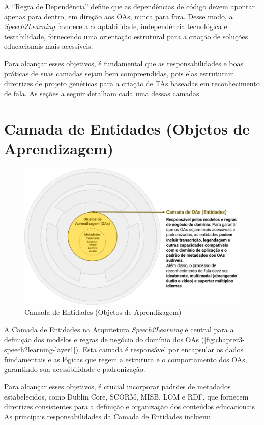 A ``Regra de Dependência'' define que as dependências de código devem apontar apenas para dentro, em direção aos OAs, nunca para fora. Desse modo, a \textit{Speech2Learning} favorece a adaptabilidade, independência tecnológica e testabilidade, fornecendo uma orientação estrutural para a criação de soluções educacionais mais acessíveis. 

Para alcançar esses objetivos, é fundamental que as responsabilidades e boas práticas de suas camadas sejam bem compreendidas, pois elas estruturam diretrizes de projeto genéricas para a criação de TAs baseadas em reconhecimento de fala. As seções a seguir detalham cada uma dessas camadas.

\section{Camada de Entidades (Objetos de Aprendizagem)}

\begin{figure}[htb]
\centering
\caption{Camada de Entidades (Objetos de Aprendizagem)}
\label{fig:chapter3-speech2learning-layer1}
\includegraphics[width=1\textwidth]{images/chapter3-speech2learning-layer1.png}
\end{figure}

A Camada de Entidades na Arquitetura \textit{Speech2Learning} é central para a definição dos modelos e regras de negócio do domínio dos OAs (\autoref{fig:chapter3-speech2learning-layer1}). Esta camada é responsável por encapsular os dados fundamentais e as lógicas que regem a estrutura e o comportamento dos OAs, garantindo sua acessibilidade e padronização. 

Para alcançar esses objetivos, é crucial incorporar padrões de metadados estabelecidos, como Dublin Core, SCORM, MISB, LOM e RDF, que fornecem diretrizes consistentes para a definição e organização dos conteúdos educacionais \cite{Santana2023}. As principais responsabilidades da Camada de Entidades incluem:

